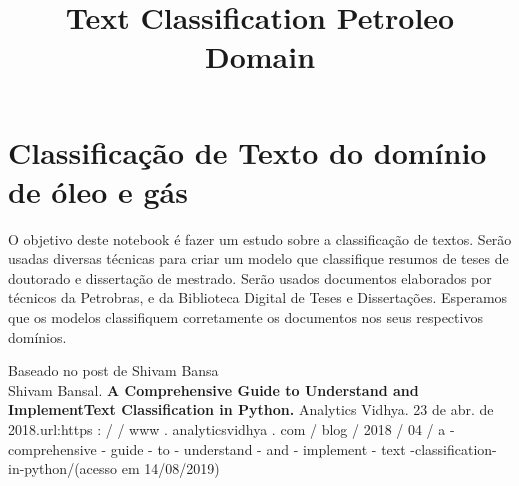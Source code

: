 \documentclass[11pt]{article}
\title{Text Classification Petroleo Domain}
\begin{document}
    
    
    \maketitle
    
    

    
    \hypertarget{classificauxe7uxe3o-de-texto-do-domuxednio-de-uxf3leo-e-guxe1s}{%
\section{Classificação de Texto do domínio de óleo e
gás}\label{classificauxe7uxe3o-de-texto-do-domuxednio-de-uxf3leo-e-guxe1s}}

O objetivo deste notebook é fazer um estudo sobre a classificação de
textos. Serão usadas diversas técnicas para criar um modelo que
classifique resumos de teses de doutorado e dissertação de mestrado.
Serão usados documentos elaborados por técnicos da Petrobras, e da
Biblioteca Digital de Teses e Dissertações. Esperamos que os modelos
classifiquem corretamente os documentos nos seus respectivos domínios.

Baseado no post de Shivam Bansa\\
Shivam Bansal. \textbf{A Comprehensive Guide to Understand and
ImplementText Classification in Python.} Analytics Vidhya. 23 de abr. de
2018.url:https : / / www . analyticsvidhya . com / blog / 2018 / 04 / a
-comprehensive - guide - to - understand - and - implement - text
-classification-in-python/(acesso em 14/08/2019)
\end{document}
